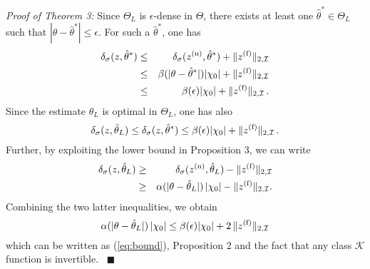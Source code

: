 \documentclass[letterpaper, 10 pt, conference]{ieeetran}
\def\qedp{\hspace*{\fill}~{\tiny $\blacksquare$}}
\begin{document}
{\em Proof of Theorem 3:}
Since $\Theta_L$ is $\epsilon$-dense in $\Theta$, there exists at least one $\hat \theta^* \in \Theta_L$ such that $| \theta -\hat \theta^*| \le \epsilon$. For such a
$\hat \theta^*$, one has
\begin{eqnarray*}
{\delta_{\sigma}(z,{\hat \theta^*})} &\le& {\delta_{\sigma}(z^{({\rm n})} ,{\hat \theta^*})} + \| z^{({\rm f})} \|_{2, \mathcal I} \\ 
&\le& \beta (| \theta - \hat \theta^*|) | \chi_0 | + \| z^{({\rm f})} \|_{2, \mathcal I}  \\ &\le& \beta (\epsilon) | \chi_0 | + \| z^{({\rm f})} \|_{2, \mathcal I}  \, .
\end{eqnarray*}
Since the estimate $\hat \theta_L$ is optimal in $\Theta_L$, one has also
\[
{\delta_{\sigma}(z,{\hat \theta_L})} \le  {\delta_{\sigma}(z,{\hat \theta^*})} \le \beta (\epsilon) | \chi_0 | + \| z^{({\rm f})} \|_{2, \mathcal I}  \, .
\]
Further, by exploiting the lower bound in Proposition 3, we can write
\begin{eqnarray*}
{\delta_{\sigma}(z,{\hat \theta_L})} &\ge& {\delta_{\sigma}(z^{({\rm n})} ,{\hat \theta_L})} - \| z^{({\rm f})} \|_{2, \mathcal I}  \\
&\ge & \alpha (| \theta - \hat \theta_L|) \, |\chi_0|  - \| z^{({\rm f})} \|_{2, \mathcal I} .
\end{eqnarray*}
Combining the two latter inequalities, we obtain
\[
 \alpha (| \theta - \hat \theta_L|) \, |\chi_0| \le  \beta (\epsilon) | \chi_0 | + 2 \, \| z^{({\rm f})} \|_{2, \mathcal I} 
\]
which can be written as (\ref{eq:bound}), Proposition 2 and the fact that any class $\mathcal K$ function is invertible. 
\qedp

 
      

\end{document}
